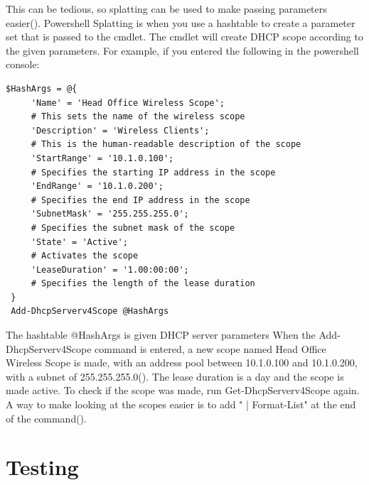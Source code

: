 This can be tedious, so splatting can be used to make passing parameters 
easier(\cite{Splat}). Powershell Splatting is when you use a hashtable to create 
a parameter set that is passed to the cmdlet. The cmdlet will create DHCP scope according to 
the given parameters. For example, if you entered the following in the powershell console:
\begin{verbatim}
$HashArgs = @{
     'Name' = 'Head Office Wireless Scope';  
     # This sets the name of the wireless scope
     'Description' = 'Wireless Clients';     
     # This is the human-readable description of the scope
     'StartRange' = '10.1.0.100';            
     # Specifies the starting IP address in the scope
     'EndRange' = '10.1.0.200';              
     # Specifies the end IP address in the scope
     'SubnetMask' = '255.255.255.0';         
     # Specifies the subnet mask of the scope
     'State' = 'Active';                     
     # Activates the scope
     'LeaseDuration' = '1.00:00:00';         
     # Specifies the length of the lease duration
 }
 Add-DhcpServerv4Scope @HashArgs
\end{verbatim}

The hashtable @HashArgs is given DHCP server parameters
When the Add-DhcpServerv4Scope command is entered, a new scope named Head Office 
Wireless Scope is made, with an address pool between 10.1.0.100 and 10.1.0.200,
with a subnet of 255.255.255.0(\cite{DHCPWeb}). The lease duration is a day and the scope is made active.
To check if the scope was made, run Get-DhcpServerv4Scope again.
A way to make looking at the scopes easier is to add " | Format-List" 
at the end of the command(\cite{DHCPWeb}).

\section{Testing}

